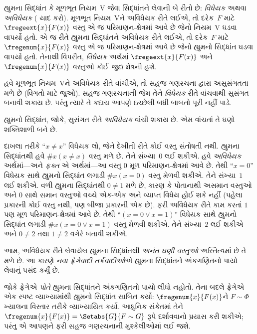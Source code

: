હ્યુમના સિદ્ધાંત કે મૂળભૂત નિયમ~V જેવા સિદ્ધાંતને
લેવાની બે રીતો છે: \emph{વિધેયક} અથવા
\emph{અવિધેયક} (
યાદ કરો). મૂળભૂત નિયમ~Vને અવિધેયક રીતે લઈએ,
તો દરેક~$F$ માટે $\fregeext{x}{F(x)}$ વસ્તુ
એ જ પરિમાણન-ક્ષેત્રમાં આવે છે જેનો નિયમ~V
ઘડવા વાપર્યો હતો. એ જ રીતે હ્યુમના સિદ્ધાંતને
અવિધેયક રીતે લઈએ, તો દરેક~$F$ માટે
$\fregenum{x}{F(x)}$ વસ્તુ એ જ પરિમાણન-ક્ષેત્રમાં
આવે છે જેનો હ્યુમનો સિદ્ધાંત ઘડવા વાપર્યો હતો.
તેનાથી વિપરીત, \emph{વિધેયક} અર્થમાં
$\fregeext{x}{F(x)}$ અને~$\fregenum{x}{F(x)}$
વસ્તુઓ કોઈ \emph{જુદા} ક્ષેત્રની હશે.

હવે મૂળભૂત નિયમ~Vને અવિધેયક રીતે વાંચીએ, તો
સહજ ગણરચના દ્વારા અસુસંગતતા મળે છે
(વિગતો માટે  જુઓ).
સહજ ગણરચનાની જેમ તેને \emph{વિધેયક} રીતે
વાંચવાથી સુસંગત બનાવી શકાય છે. પરંતુ ત્યારે તે
કદાચ આપણે ઇચ્છેલી બધી બાબતો પૂરી નહીં પાડે.

હ્યુમનો સિદ્ધાંત, જોકે, સુસંગત રીતે
\emph{અવિધેયક} વાંચી શકાય છે. એમ વાંચતાં તે
ઘણો શક્તિશાળી બને છે.

દાખલા તરીકે ``$x \neq x$'' વિધેયક લો, જેને
દેખીતી રીતે કોઈ વસ્તુ સંતોષતી નથી. હ્યુમના
સિદ્ધાંતથી હવે $\# x( x\neq x)$ વસ્તુ મળે છે.
તેને સંખ્યા~$0$ લઈ શકીએ. હવે \emph{અવિધેયક}
અર્થમાં---અને \emph{ફક્ત} એ અર્થમાં---આ વસ્તુ
$0$ મૂળ પરિમાણન-ક્ષેત્રમાં આવે છે. તેથી
``$x = 0$'' વિધેયક સાથે હ્યુમનો સિદ્ધાંત લગાડી
$\#x (x = 0)$ વસ્તુ મેળવી શકીએ. તેને સંખ્યા~$1$
લઈ શકીએ. વળી હ્યુમના સિદ્ધાંતથી $0 \neq 1$
મળે છે, કારણ કે પોતાનાથી અસમાન વસ્તુઓ અને $0$
સાથે સમાન વસ્તુઓ વચ્ચે એક-એક અને વ્યાપ્ત વિધેય
હોઈ શકે નહીં (પહેલા પ્રકારની કોઈ વસ્તુ નથી, પણ
બીજા પ્રકારની એક છે). ફરી અવિધેયક રીતે કામ કરતાં
$1$ પણ મૂળ પરિમાણન-ક્ષેત્રમાં આવે છે. તેથી
``$(x = 0 \lor x = 1)$'' વિધેયક સાથે હ્યુમનો
સિદ્ધાંત લગાડી $\#x(x = 0 \lor x = 1)$ વસ્તુ
મેળવી શકીએ. તેને સંખ્યા~$2$ લઈ શકીએ અને
$0\neq 2$ તથા $1 \neq 2$ વગેરે બતાવી શકીએ.

આમ, અવિધેયક રીતે લેવાયેલ હ્યુમના સિદ્ધાંતથી
\emph{અનંત ઘણી વસ્તુઓ} અસ્તિત્વમાં છે તે મળે છે.
આ કારણે \emph{નવા ફ્રેગેવાદી તર્કવાદીઓ}એ
હ્યુમના સિદ્ધાંતને અંકગણિતનો પાયો લેવાનું પસંદ કર્યું છે.

જોકે ફ્રેગેએ \emph{પોતે} હ્યુમના સિદ્ધાંતને
અંકગણિતનો પાયો લીધો નહોતો. તેના બદલે ફ્રેગેએ
એક સ્પષ્ટ વ્યાખ્યામાંથી હ્યુમનો સિદ્ધાંત સાબિત
કર્યો: $\fregenum{x}{F(x)}$ને $F \sim \Phi$
ખ્યાલના વિસ્તાર તરીકે વ્યાખ્યાયિત કર્યો.
આધુનિક સંકેતમાં તેને
$\fregenum{x}{F(x)} = \Setabs{G}{F \sim G}$
રૂપે દર્શાવવાનો પ્રયાસ કરી શકીએ; પરંતુ એ આપણને
ફરી સહજ ગણરચનાની મુશ્કેલીઓમાં લઈ જશે.
\endgroup


\OLEndChapterHook
\endgroup

